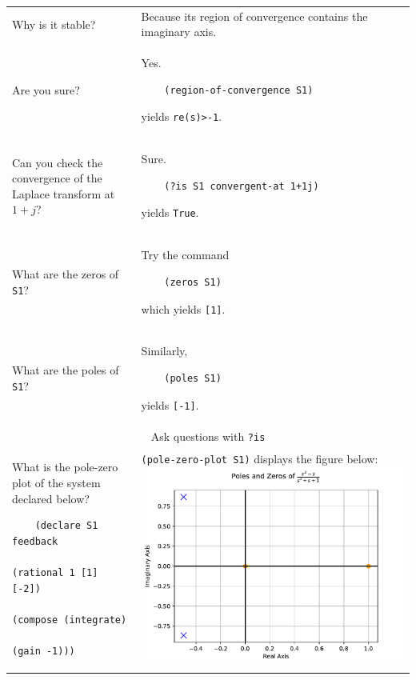 \documentclass[11pt,letter]{article}
\begin{document}
\begin{longtable}{ p{} p{} }
  Why is it stable?
  &
  Because its region of convergence contains the imaginary axis. \\

  Are you sure?
  &
  Yes.
  \begin{lstlisting}
    (region-of-convergence S1)
  \end{lstlisting}
  yields \lstinline!re(s)>-1!. \\

  Can you check the convergence of the Laplace transform at $1+j$?
  &
  Sure.
  \begin{lstlisting}
    (?is S1 convergent-at 1+1j)
  \end{lstlisting}
  yields \lstinline!True!. \\

  What are the zeros of \lstinline!S1!?
  &
  Try the command
  \begin{lstlisting}
    (zeros S1)
  \end{lstlisting}
  which yields \lstinline![1]!. \\

  What are the poles of \lstinline!S1!?
  &
  Similarly,
  \begin{lstlisting}
    (poles S1)
  \end{lstlisting}
  yields \lstinline![-1]!. \\

  \midrule

  \multicolumn{2}{c}{\Large Ask questions with \lstinline!?is!} \\

  \midrule

  What is the pole-zero plot of the system declared below?
  \begin{lstlisting}
    (declare S1 feedback
                (rational 1 [1] [-2])
                (compose (integrate)
                         (gain -1)))
  \end{lstlisting}
  &
  \lstinline!(pole-zero-plot S1)! displays the figure below:
  \includegraphics[width=\linewidth]{figs/pz-feedback} \\


\end{longtable}
\end{document}
